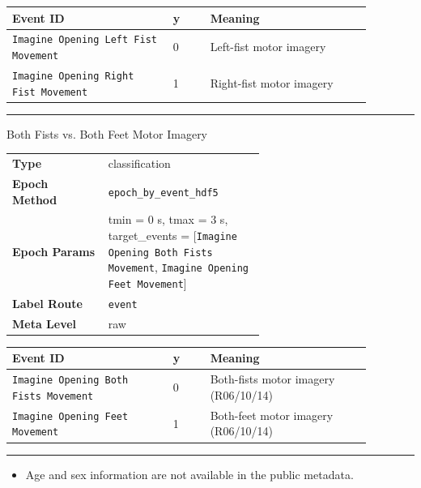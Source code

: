 {\begin{tcolorbox}
\begingroup\footnotesize
\begin{tabular}{@{}p{0.3911\linewidth}p{0.0978\linewidth}p{0.3911\linewidth}@{}}
\toprule
\textbf{Event ID} & \textbf{y} & \textbf{Meaning} \\
\midrule
\texttt{Imagine Opening Left Fist Movement} & 0 & Left-fist motor imagery \\
\texttt{Imagine Opening Right Fist Movement} & 1 & Right-fist motor imagery \\
\bottomrule
\end{tabular}
\endgroup
\noindent\rule{\linewidth}{0.4pt}\par\nopagebreak
{} {\footnotesize Both Fists vs. Both Feet Motor Imagery}\par\smallskip
{\footnotesize\begin{tabular}{@{}lp{0.62\linewidth}@{}}
\textbf{Type} & classification \\
\textbf{Epoch Method} & \texttt{epoch\_by\_event\_hdf5} \\
\textbf{Epoch Params} & tmin = 0 s, tmax = 3 s, target\_events = [\texttt{Imagine Opening Both Fists Movement}, \texttt{Imagine Opening Feet Movement}] \\
\textbf{Label Route} & \texttt{event} \\
\textbf{Meta Level} & raw \\
\end{tabular}}
\par{}\par\smallskip
\begingroup\footnotesize
\begin{tabular}{@{}p{0.3911\linewidth}p{0.0978\linewidth}p{0.3911\linewidth}@{}}
\toprule
\textbf{Event ID} & \textbf{y} & \textbf{Meaning} \\
\midrule
\texttt{Imagine Opening Both Fists Movement} & 0 & Both-fists motor imagery (R06/10/14) \\
\texttt{Imagine Opening Feet Movement} & 1 & Both-feet motor imagery (R06/10/14) \\
\bottomrule
\end{tabular}
\endgroup
\par\smallskip
\noindent\rule{\linewidth}{0.4pt}\par\nopagebreak
{}\par\smallskip
\begin{itemize}[leftmargin=1.4em,noitemsep,topsep=2pt]
\item{\footnotesize Age and sex information are not available in the public metadata.}

\end{itemize}
\end{tcolorbox}}
